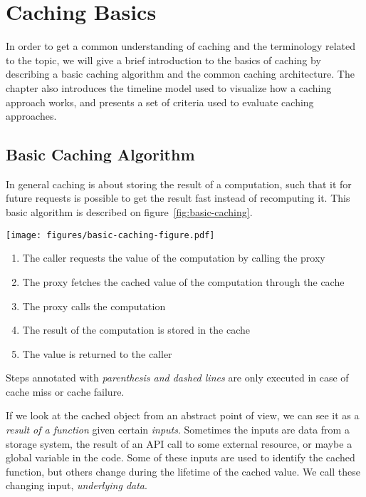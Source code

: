 \chapter{Caching Basics}
\label{chapter:caching-model}

In order to get a common understanding of caching and the terminology related to the topic, we will give a brief introduction to the basics of caching by describing a basic caching algorithm and the common caching architecture. The chapter also introduces the timeline model used to visualize how a caching approach works, and presents a set of criteria used to evaluate caching approaches.

\section{Basic Caching Algorithm}
\label{sec:caching_basics}

In general caching is about storing the result of a computation, such that it for future requests is possible to get the result fast instead of recomputing it. This basic algorithm is described on figure~\ref{fig:basic-caching}.

\begin{figure*}[ht!]
  \begin{center}
    \texttt{[image: figures/basic-caching-figure.pdf]}
  \end{center}
  \begin{enumerate}
    \item The caller requests the value of the computation by calling the proxy
    \item The proxy fetches the cached value of the computation through the cache
    \item[(3)] The proxy calls the computation
    \item[(4)] The result of the computation is stored in the cache
    \item The value is returned to the caller
  \end{enumerate}
  \footnotesize{Steps annotated with \emph{parenthesis and dashed lines} are only executed in case of cache miss or cache failure.}
  \caption{The flow of basic caching}
  \label{fig:basic-caching}
\end{figure*}

If we look at the cached object from an abstract point of view, we can see it as a \emph{result of a function} given certain \emph{inputs}. Sometimes the inputs are data from a storage system, the result of an API call to some external resource, or maybe a global variable in the code. Some of these inputs are used to identify the cached function, but others change during the lifetime of the cached value. We call these changing input, \emph{underlying data}.

